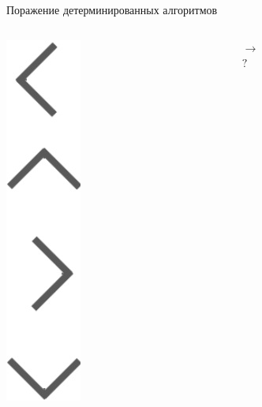 \documentclass[aspectratio=169, professionalfonts]{beamer}
\begin{document}
\begin{frame}{Поражение детерминированных алгоритмов}
\begin{columns}
\begin{column}{.07\linewidth}
            \includegraphics[width=\linewidth]{figures/fig27-corners.jpg}
        \end{column}
        \begin{column}{.13\linewidth}
            \centering
            \( \longrightarrow  \) \\
            \(? \)
        \end{column}
    \end{columns}
\end{frame}
\end{document}
